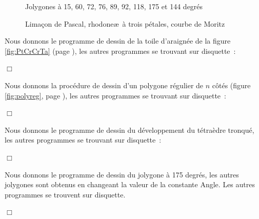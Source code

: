 \begin{figure}[htbp]
 \caption{Jolygones à 15, 60, 72, 76, 89, 92, 118, 175 et 144 degrés}\label{fig:jgones}
\end{figure}
\begin{figure}[htbp]
 \caption{Limaçon de Pascal, rhodone\ae\ à trois pétales, courbe de Moritz}\label{fig:courbpo}
\end{figure}
\begin{corrige}{
Nous donnons le programme de dessin de la toile d'araignée de la figure \ref{fig:PtCrCrTa} 
(page \pageref{fig:PtCrCrTa}), les autres programmes se trouvant sur disquette~:

\noindent $\Box$}\end{corrige}
\begin{corrige}{
Nous donnons la procédure de dessin d'un polygone régulier de $n$ côtés (figure \ref{fig:polyreg}, 
page \pageref{fig:polyreg}), les autres programmes se trouvant  sur disquette~:

\noindent $\Box$}\end{corrige}
\begin{corrige}{
Nous donnons le programme de dessin du développement du té\-traè\-dre tron\-qué, les autres 
programmes se trouvant  sur disquette~:

\noindent $\Box$}\end{corrige}
\begin{corrige}{
Nous donnons le programme de dessin du jolygone à 175 degrés, les autres jolygones sont obtenus en changeant la
valeur de la constante {\idt Angle}. Les autres programmes se trouvent  sur disquette.

\noindent $\Box$}\end{corrige}

\clearpage

